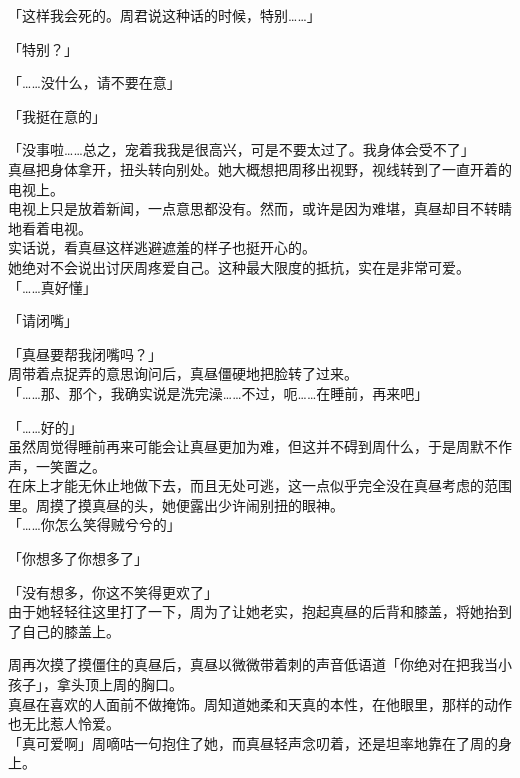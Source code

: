 「这样我会死的。周君说这种话的时候，特别……」

「特别？」

「……没什么，请不要在意」

「我挺在意的」

「没事啦……总之，宠着我我是很高兴，可是不要太过了。我身体会受不了」\\

真昼把身体拿开，扭头转向别处。她大概想把周移出视野，视线转到了一直开着的电视上。\\

电视上只是放着新闻，一点意思都没有。然而，或许是因为难堪，真昼却目不转睛地看着电视。\\

实话说，看真昼这样逃避遮羞的样子也挺开心的。\\

她绝对不会说出讨厌周疼爱自己。这种最大限度的抵抗，实在是非常可爱。\\

「……真好懂」

「请闭嘴」

「真昼要帮我闭嘴吗？」\\

周带着点捉弄的意思询问后，真昼僵硬地把脸转了过来。\\

「……那、那个，我确实说是洗完澡……不过，呃……在睡前，再来吧」

「……好的」\\

虽然周觉得睡前再来可能会让真昼更加为难，但这并不碍到周什么，于是周默不作声，一笑置之。\\

在床上才能无休止地做下去，而且无处可逃，这一点似乎完全没在真昼考虑的范围里。周摸了摸真昼的头，她便露出少许闹别扭的眼神。\\

「……你怎么笑得贼兮兮的」

「你想多了你想多了」

「没有想多，你这不笑得更欢了」\\

由于她轻轻往这里打了一下，周为了让她老实，抱起真昼的后背和膝盖，将她抬到了自己的膝盖上。

周再次摸了摸僵住的真昼后，真昼以微微带着刺的声音低语道「你绝对在把我当小孩子」，拿头顶上周的胸口。\\

真昼在喜欢的人面前不做掩饰。周知道她柔和天真的本性，在他眼里，那样的动作也无比惹人怜爱。\\

「真可爱啊」周嘀咕一句抱住了她，而真昼轻声念叨着，还是坦率地靠在了周的身上。
